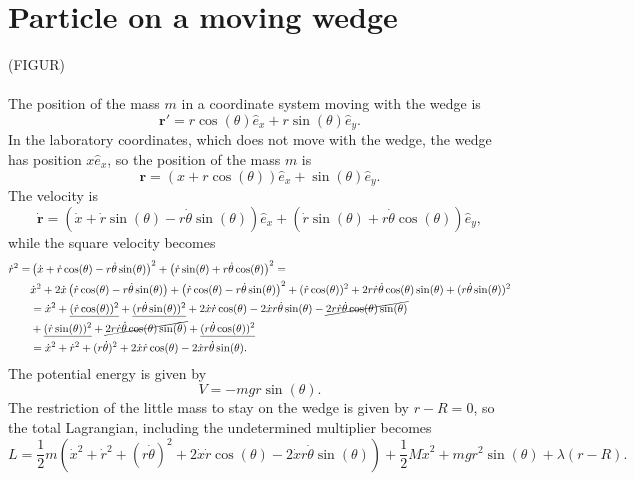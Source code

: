 \documentclass{article}
\begin{document}
    \section{Particle on a moving wedge}
        (FIGUR) \\ \\
        The position of the mass $m$ in a coordinate system moving with the wedge is
        \begin{equation*}
            \mathbf{r}' = r \cos(\theta) \hat e_x + r \sin(\theta) \hat e_y.
        \end{equation*}
        In the laboratory coordinates, which does not move with the wedge, the wedge has position $x \hat e_x$, so the position of the mass $m$ is 
        \begin{equation*}
            \mathbf{r} = (x + r \cos(\theta)) \hat e_x + \sin(\theta) \hat e_y.
        \end{equation*}
        The velocity is
        \begin{equation*}
            \mathbf{\dot r}
            = (\dot x  + \dot r \sin(\theta) - r \dot \theta \sin(\theta)) \hat e_x
            + (\dot r \sin(\theta) + r \dot \theta \cos(\theta)) \hat e_y,
        \end{equation*}
        while the square velocity becomes
        \begin{align*}
            \dot r^2 = & \left(\dot x  + \dot r \cos(\theta) - r \dot \theta \sin(\theta)\right)^2 + \left(\dot r \sin(\theta) + r \dot \theta \cos(\theta)\right)^2 = \\
            & \dot x^2 + 2 \dot x \left(\dot r \cos(\theta) - r \dot \theta \sin(\theta)\right) + \left(\dot r \cos(\theta) - r \dot \theta \sin(\theta)\right)^2 
            + (\dot r \cos(\theta))^2 + 2r \dot r \dot \theta \cos(\theta) \sin(\theta) + (r \dot \theta \sin(\theta))^2\\
            & = \dot x^2 + \underline{(\dot r\cos(\theta))^2} + \underline{(r \dot \theta \sin(\theta))^2} + 2 \dot x \dot r \cos(\theta) - 2 \dot x r \dot \theta \sin(\theta) - \cancel{2 r \dot r \dot \theta \cos(\theta) \sin(\theta)} \\
            & + \underline{(\dot r \sin(\theta))^2} + \cancel{2r \dot r \dot \theta \cos(\theta) \sin(\theta)} + \underline{(r \dot \theta \cos(\theta))^2}\\
            & = \dot x^2 + \dot r^2 + (r \dot \theta)^2+ 2 \dot x \dot r \cos(\theta) - 2 \dot x r \dot \theta \sin(\theta). 
        \end{align*}
        The potential energy is given by
        \begin{equation*}
            V = -m g r \sin(\theta).
        \end{equation*}
        The restriction of the little mass to stay on the wedge is given by $r - R = 0$, so the total Lagrangian, including the undetermined multiplier becomes
        \begin{equation*}
            L = \frac{1}{2}m \left(\dot x^2 + \dot r^2 + (r \dot \theta)^2+ 2 \dot x \dot r \cos(\theta) - 2 \dot x r \dot \theta \sin(\theta) \right) + \frac{1}{2}M \dot x^2 + mgr^2\sin(\theta) + \lambda(r - R).
        \end{equation*}
\end{document}
